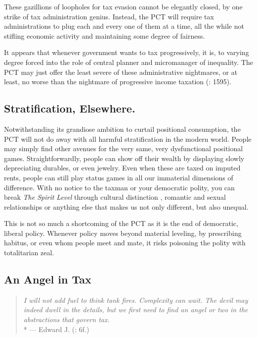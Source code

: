 These gazillions of loopholes for tax evasion cannot be elegantly closed, by one strike of tax administration genius. Instead, the PCT will require tax administrations to plug each and every one of them at a time, all the while not stifling economic activity and maintaining some degree of fairness.

It appears that whenever government wants to tax progressively, it is, to varying degree forced into the role of central planner and micromanager of inequality. The PCT may just offer the least severe of these administrative nightmares, or at least, no worse than the nightmare of progressive income taxation (\citealt{Graetz2009}: 1595).

\subsection{Stratification, Elsewhere.} Notwithstanding its grandiose ambition to curtail positional consumption, the PCT will not do away with all harmful stratification in the modern world. People may simply find other avenues for the very same, very dysfunctional positional games. Straightforwardly, people can show off their wealth by displaying slowly depreciating durables, or even jewelry. Even when these are taxed on imputed rents, people can still play status games in all our immaterial dimensions of difference. With no notice to the taxman or your democratic polity, you can break \emph{The Spirit Level} \citep{Pickett-2009-kx} through cultural distinction \citep{Bourdieu-1984-aa}, romantic and sexual relationships \citep{Mazur-1993-aa} or anything else that makes us not only different, but also unequal.

This is not so much a shortcoming of the PCT as it is the end of democratic, liberal policy. Whenever policy moves beyond material leveling, by prescribing habitus, or even whom people meet and mate, it risks poisoning the polity with totalitarian zeal.
\subsection{An Angel in Tax}

\begin{quote}
	\emph{I will not add fuel to think tank fires. Complexity can wait. The devil may indeed dwell in the details, but we first need to find an angel or two in the abstractions that govern tax.}\\*
	--- Edward J. \citeauthor{McCaffery2002} (\citeyear{McCaffery2002}: 6f.)
\end{quote}

